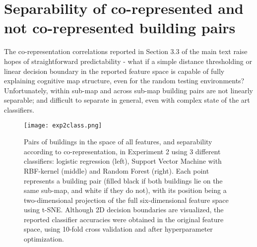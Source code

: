 \section{Separability of co-represented and not co-represented building pairs}

The co-representation correlations reported in Section 3.3 of the main text raise hopes of straightforward predictability - what if a simple distance thresholding or linear decision boundary in the reported feature space is capable of fully explaining cognitive map structure, even for the random testing environments? Unfortunately, within sub-map and across sub-map building pairs are not linearly separable; and difficult to separate in general, even with complex state of the art classifiers. 


\begin{figure}[h]
	\centering
	\texttt{[image: exp2class.png]}
	\caption{Pairs of buildings in the space of all features, and separability according to co-representation, in Experiment 2 using 3 different classifiers: logistic regression (left), Support Vector Machine with RBF-kernel (middle) and Random Forest (right). Each point represents a building pair (filled black if both buildings lie on the same sub-map, and white if they do not), with its position being a two-dimensional projection of the full six-dimensional feature space using t-SNE.  Although 2D decision boundaries are visualized, the reported classifier accuracies were obtained in the original feature space, using 10-fold cross validation and after hyperparameter optimization.}
	\label{fig_classify}
\end{figure}

